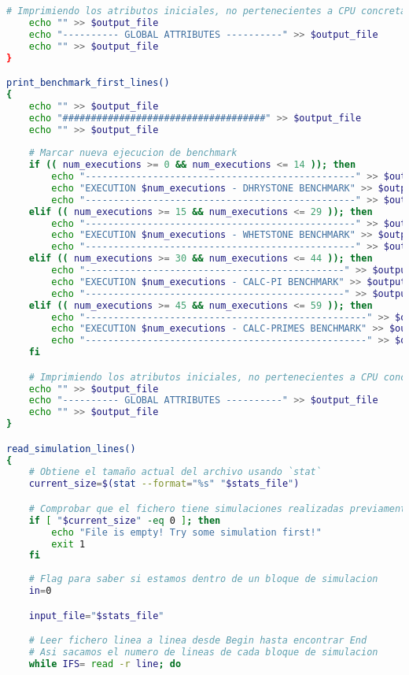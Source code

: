 \begin{lstlisting}[language=bash,caption={Programa de filtrado de estadísticas de Gem5},label=lst:getStats, showstringspaces=false,frame=single]
    # Imprimiendo los atributos iniciales, no pertenecientes a CPU concretas
    echo "" >> $output_file
    echo "---------- GLOBAL ATTRIBUTES ----------" >> $output_file
    echo "" >> $output_file
}

print_benchmark_first_lines()
{
    echo "" >> $output_file
    echo "####################################" >> $output_file
    echo "" >> $output_file
    
    # Marcar nueva ejecucion de benchmark
    if (( num_executions >= 0 && num_executions <= 14 )); then
        echo "------------------------------------------------" >> $output_file
        echo "EXECUTION $num_executions - DHRYSTONE BENCHMARK" >> $output_file
        echo "------------------------------------------------" >> $output_file
    elif (( num_executions >= 15 && num_executions <= 29 )); then
        echo "------------------------------------------------" >> $output_file
        echo "EXECUTION $num_executions - WHETSTONE BENCHMARK" >> $output_file
        echo "------------------------------------------------" >> $output_file
    elif (( num_executions >= 30 && num_executions <= 44 )); then
        echo "----------------------------------------------" >> $output_file
        echo "EXECUTION $num_executions - CALC-PI BENCHMARK" >> $output_file
        echo "----------------------------------------------" >> $output_file
    elif (( num_executions >= 45 && num_executions <= 59 )); then
        echo "--------------------------------------------------" >> $output_file
        echo "EXECUTION $num_executions - CALC-PRIMES BENCHMARK" >> $output_file
        echo "--------------------------------------------------" >> $output_file
    fi

    # Imprimiendo los atributos iniciales, no pertenecientes a CPU concretas
    echo "" >> $output_file
    echo "---------- GLOBAL ATTRIBUTES ----------" >> $output_file
    echo "" >> $output_file
}

read_simulation_lines()
{
    # Obtiene el tamaño actual del archivo usando `stat`
    current_size=$(stat --format="%s" "$stats_file")

    # Comprobar que el fichero tiene simulaciones realizadas previamente
    if [ "$current_size" -eq 0 ]; then
        echo "File is empty! Try some simulation first!"
        exit 1
    fi
    
    # Flag para saber si estamos dentro de un bloque de simulacion
    in=0

    input_file="$stats_file"

    # Leer fichero linea a linea desde Begin hasta encontrar End
    # Asi sacamos el numero de lineas de cada bloque de simulacion
    while IFS= read -r line; do


\end{lstlisting}

